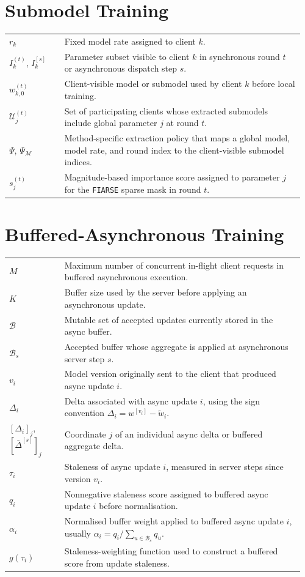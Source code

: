 \section*{Submodel Training}
\vspace{-1em}
\begin{longtable}{@{} p{0.18\linewidth} p{0.78\linewidth} @{}}
$r_k$ & Fixed model rate assigned to client $k$. \\
$I_k^{(t)}$, $I_k^{[s]}$ & Parameter subset visible to client $k$ in synchronous round $t$ or asynchronous dispatch step $s$. \\
$w_{k,0}^{(t)}$ & Client-visible model or submodel used by client $k$ before local training. \\
$\mathcal{U}_j^{(t)}$ & Set of participating clients whose extracted submodels include global parameter $j$ at round $t$. \\
$\Psi$, $\Psi_{\mathcal{M}}$ & Method-specific extraction policy that maps a global model, model rate, and round index to the client-visible submodel indices. \\
$s_j^{(t)}$ & Magnitude-based importance score assigned to parameter $j$ for the \texttt{FIARSE} sparse mask in round \(t\). \\
\end{longtable}

\section*{Buffered-Asynchronous Training}
\vspace{-1em}
\begin{longtable}{@{} p{0.18\linewidth} p{0.78\linewidth} @{}}
$M$ & Maximum number of concurrent in-flight client requests in buffered asynchronous execution. \\
$K$ & Buffer size used by the server before applying an asynchronous update. \\
$\mathcal{B}$ & Mutable set of accepted updates currently stored in the async buffer. \\
$\mathcal{B}_s$ & Accepted buffer whose aggregate is applied at asynchronous server step $s$. \\
$v_i$ & Model version originally sent to the client that produced async update $i$. \\
$\Delta_i$ & Delta associated with async update $i$, using the sign convention $\Delta_i=w^{[v_i]}-\tilde{w}_i$. \\
$[\Delta_i]_j$, $[\bar{\Delta}^{[s]}]_j$ & Coordinate \(j\) of an individual async delta or buffered aggregate delta. \\
$\tau_i$ & Staleness of async update $i$, measured in server steps since version $v_i$. \\
$q_i$ & Nonnegative staleness score assigned to buffered async update $i$ before normalisation. \\
$\alpha_i$ & Normalised buffer weight applied to buffered async update $i$, usually $\alpha_i=q_i/\sum_{u\in\mathcal{B}_s}q_u$. \\
$g(\tau_i)$ & Staleness-weighting function used to construct a buffered score from update staleness. \\
\end{longtable}

